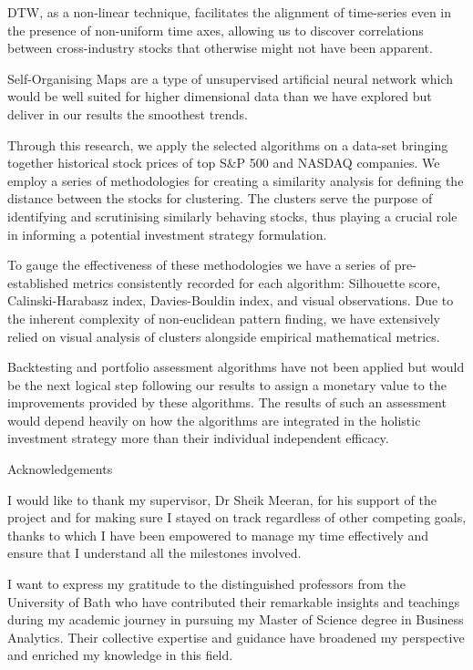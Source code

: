 \documentclass[11pt]{article}
\begin{document}
DTW, as a non-linear technique, facilitates the alignment of time-series even in the presence of non-uniform time axes, allowing us to discover correlations between cross-industry stocks that otherwise might not have been apparent.

Self-Organising Maps are a type of unsupervised artificial neural network which would be well suited for higher dimensional data than we have explored but deliver in our results the smoothest trends.

Through this research, we apply the selected algorithms on a data-set bringing together historical stock prices of top S\&P 500 and NASDAQ companies. We employ a series of methodologies for creating a similarity analysis for defining the distance between the stocks for clustering. The clusters serve the purpose of identifying and scrutinising similarly behaving stocks, thus playing a crucial role in informing a potential investment strategy formulation.

To gauge the effectiveness of these methodologies we have a series of pre-established metrics consistently recorded for each algorithm: Silhouette score, Calinski-Harabasz index, Davies-Bouldin index, and visual observations. Due to the inherent complexity of non-euclidean pattern finding, we have extensively relied on visual analysis of clusters alongside empirical mathematical metrics.

Backtesting and portfolio assessment algorithms have not been applied but would be the next logical step following our results to assign a monetary value to the improvements provided by these algorithms. The results of such an assessment would depend heavily on how the algorithms are integrated in the holistic investment strategy more than their individual independent efficacy.


\newpage

\begin{center} {\LARGE Acknowledgements} \end{center}

I would like to thank my supervisor, Dr Sheik Meeran, for his support of the project and for making sure I stayed on track regardless of other competing goals, thanks to which I have been empowered to manage my time effectively and ensure that I understand all the milestones involved.

 I want to express my gratitude to the distinguished professors from the University of Bath who have contributed their remarkable insights and teachings during my academic journey in pursuing my Master of Science degree in Business Analytics. Their collective expertise and guidance have broadened my perspective and enriched my knowledge in this field.
\end{document}
